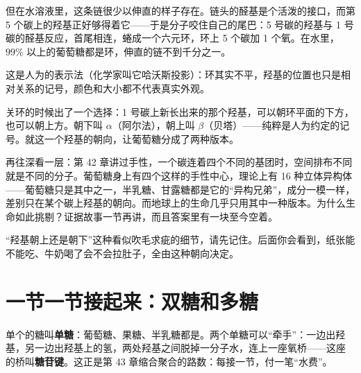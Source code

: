 但在水溶液里，这条链很少以伸直的样子存在。链头的醛基是个活泼的接口，而第 5 个碳上的羟基正好够得着它——于是分子咬住自己的尾巴：5 号碳的羟基与 1 号碳的醛基反应，首尾相连，蜷成一个六元环，环上 5 个碳加 1 个氧。在水里，$99\%$ 以上的葡萄糖都是环，伸直的链不到千分之一。

\begin{center}
\end{center}

这是人为的表示法（化学家叫它哈沃斯投影）：环其实不平，羟基的位置也只是相对关系的记号，颜色和大小都不代表真实外观。

关环的时候出了一个选择：1 号碳上新长出来的那个羟基，可以朝环平面的下方，也可以朝上方。朝下叫 $\alpha$（阿尔法），朝上叫 $\beta$（贝塔）——纯粹是人为约定的记号。就这一个羟基的朝向，让葡萄糖分成了两种版本。

再往深看一层：第 42 章讲过手性，一个碳连着四个不同的基团时，空间排布不同就是不同的分子。葡萄糖身上有四个这样的手性中心，理论上有 16 种立体异构体——葡萄糖只是其中之一，半乳糖、甘露糖都是它的“异构兄弟”，成分一模一样，差别只在某个碳上羟基的朝向。而地球上的生命几乎只用其中一种版本。为什么生命如此挑剔？证据故事一节再讲，而且答案里有一块至今空着。

“羟基朝上还是朝下”这种看似吹毛求疵的细节，请先记住。后面你会看到，纸张能不能吃、牛奶喝了会不会拉肚子，全由这种朝向决定。

\section{一节一节接起来：双糖和多糖}

单个的糖叫\textbf{单糖}：葡萄糖、果糖、半乳糖都是。两个单糖可以“牵手”：一边出羟基，另一边出羟基上的氢，两处羟基之间脱掉一分子水，连上一座氧桥——这座  的桥叫\textbf{糖苷键}。这正是第 43 章缩合聚合的路数：每接一节，付一笔“水费”。

